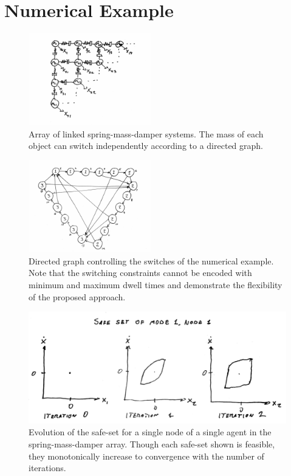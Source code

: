 \section{Numerical Example}
\begin{figure}[t]
\centering
\includegraphics[height=4cm]{./figures/num_ex_sys}
\caption{Array of linked spring-mass-damper systems. The mass of each object can switch independently according to a directed graph.}
\label{fig:num_ex_sys}
\end{figure}
\begin{figure}[t]
\centering
\includegraphics[height=4cm]{./figures/num_ex_graph}
\caption{Directed graph controlling the switches of the numerical example. Note that the switching constraints cannot be encoded with minimum and maximum dwell times and demonstrate the flexibility of the proposed approach.}
\label{fig:num_ex_graph}
\end{figure}
\begin{figure}[t]
\centering
\includegraphics[width=\columnwidth]{./figures/num_ex_results}
\caption{Evolution of the safe-set for a single node of a single agent in the spring-mass-damper array. Though each safe-set shown is feasible, they monotonically increase to convergence with the number of iterations.}
\label{fig:num_ex_results}
\end{figure}
